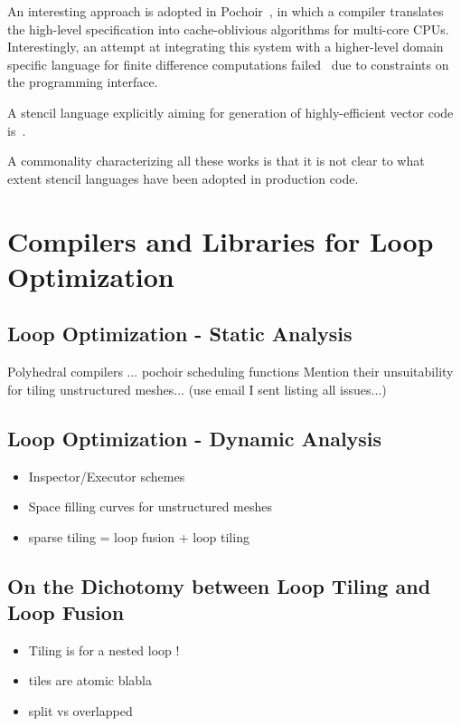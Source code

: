 An interesting approach is adopted in Pochoir~\cite{pochoir}, in which a compiler translates the high-level specification into cache-oblivious algorithms for multi-core CPUs. Interestingly, an attempt at integrating this system with a higher-level domain specific language for finite difference computations failed~\cite{tj-thesis} due to constraints on the programming interface. 

A stencil language explicitly aiming for generation of highly-efficient vector code is~\cite{stencil-compiler-2-simd}.

A commonality characterizing all these works is that it is not clear to what extent stencil languages have been adopted in production code. 


\section{Compilers and Libraries for Loop Optimization}
\label{sec:bkg:codeopt}


\subsection{Loop Optimization - Static Analysis}
\label{sec:bkg:poly}
Polyhedral compilers ...
pochoir
scheduling functions
Mention their unsuitability for tiling unstructured meshes... (use email I sent listing all issues...)




\subsection{Loop Optimization - Dynamic Analysis}
\label{sec:bkg:ie}
\begin{itemize}
\item Inspector/Executor schemes
\item Space filling curves for unstructured meshes
\item sparse tiling = loop fusion + loop tiling
\end{itemize}


\subsection{On the Dichotomy between Loop Tiling and Loop Fusion}
\label{sec:bkg:tiling}

\begin{itemize}
\item Tiling is for a nested loop ! 
\item tiles are atomic blabla
\item split vs overlapped
\end{itemize}


